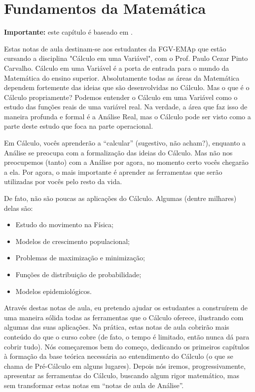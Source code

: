 \chapter{Fundamentos da Matemática}
\label{cap:01-fundamentos-da-matemática}

\textbf{Importante:} este capítulo é baseado em \cite{lima2017curso1}.

Estas notas de aula destinam-se aos estudantes da FGV-EMAp que estão cursando a disciplina "Cálculo em uma Variável", com o Prof. Paulo Cezar Pinto Carvalho. Cálculo em uma Variável é a porta de entrada para o mundo da Matemática do ensino superior. Absolutamente todas as áreas da Matemática dependem fortemente das ideias que são desenvolvidas no Cálculo. Mas o que é o Cálculo propriamente? Podemos entender o Cálculo em uma Variável como o estudo das funções reais de uma variável real. Na verdade, a área que faz isso de maneira profunda e formal é a Análise Real, mas o Cálculo pode ser visto como a parte deste estudo que foca na parte operacional. 

Em Cálculo, vocês aprenderão a ``calcular'' (sugestivo, não acham?), enquanto a Análise se preocupa com a formalização das ideias do Cálculo. Mas não nos preocupemos (tanto) com a Análise por agora, no momento certo vocês chegarão a ela. Por agora, o mais importante é aprender as ferramentas que serão utilizadas por vocês pelo resto da vida.

De fato, não são poucas as aplicações do Cálculo. Algumas (dentre milhares) delas são:

\begin{itemize}
	\item Estudo do movimento na Física;
	
	\item Modelos de crescimento populacional;
	
	\item Problemas de maximização e minimização;
	
	\item Funções de distribuição de probabilidade;
	
	\item Modelos epidemiológicos.
\end{itemize}

Através destas notas de aula, eu pretendo ajudar os estudantes a construírem de uma maneira sólida todas as ferramentas que o Cálculo oferece, ilustrando com algumas das suas aplicações. Na prática, estas notas de aula cobrirão mais conteúdo do que o curso cobre (de fato, o tempo é limitado, então nunca dá para cobrir tudo). Nós começaremos bem do começo, dedicando os primeiros capítulos à formação da base teórica necessária ao entendimento do Cálculo (o que se chama de Pré-Cálculo em alguns lugares). Depois nós iremos, progressivamente, apresentar as ferramentas do Cálculo, buscando algum rigor matemático, mas sem transformar estas notas em ``notas de aula de Análise''.

